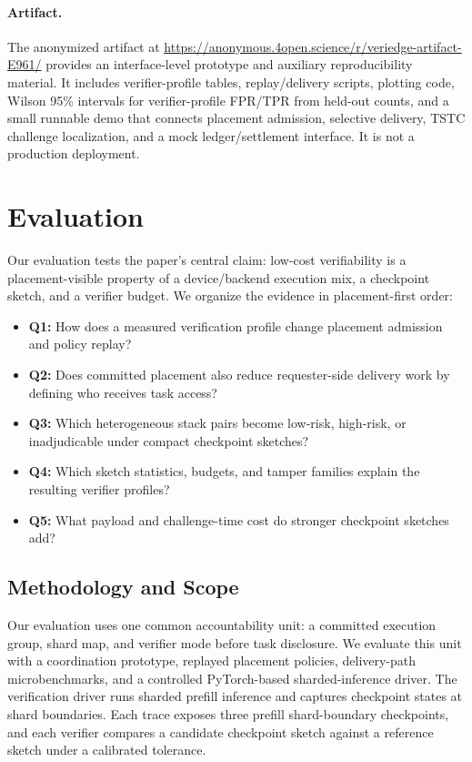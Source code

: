\documentclass[sigplan,screen,review,anonymous]{acmart}
\begin{document}
\paragraph{Artifact.}
The anonymized artifact at
\url{https://anonymous.4open.science/r/veriedge-artifact-E961/} provides an
interface-level prototype and auxiliary reproducibility material. It includes
verifier-profile tables, replay/delivery scripts, plotting code, Wilson 95\%
intervals for verifier-profile FPR/TPR from held-out counts, and a small
runnable demo that connects placement admission, selective delivery, TSTC
challenge localization, and a mock ledger/settlement interface. It is not a
production deployment.




\section{Evaluation}
\label{sec:evaluation}

Our evaluation tests the paper's central claim: low-cost verifiability is a
placement-visible property of a device/backend execution mix, a checkpoint
sketch, and a verifier budget. We organize the evidence in placement-first
order:
\begin{itemize}[leftmargin=1.5em]
	\item \textbf{Q1:} How does a measured verification profile change
	placement admission and policy replay?
	\item \textbf{Q2:} Does committed placement also reduce requester-side
	delivery work by defining who receives task access?
	\item \textbf{Q3:} Which heterogeneous stack pairs become low-risk,
	high-risk, or inadjudicable under compact checkpoint sketches?
	\item \textbf{Q4:} Which sketch statistics, budgets, and tamper families
	explain the resulting verifier profiles?
	\item \textbf{Q5:} What payload and challenge-time cost do stronger
	checkpoint sketches add?
\end{itemize}

\subsection{Methodology and Scope}
\label{subsec:eval-methodology}

Our evaluation uses one common accountability unit: a committed execution
group, shard map, and verifier mode before task disclosure. We evaluate this
unit with a coordination prototype, replayed placement policies, delivery-path
microbenchmarks, and a controlled PyTorch-based sharded-inference driver. The
verification driver runs sharded prefill inference and captures checkpoint
states at shard boundaries. Each trace exposes three prefill shard-boundary
checkpoints, and each verifier compares a candidate checkpoint sketch against
a reference sketch under a calibrated tolerance.
\end{document}
